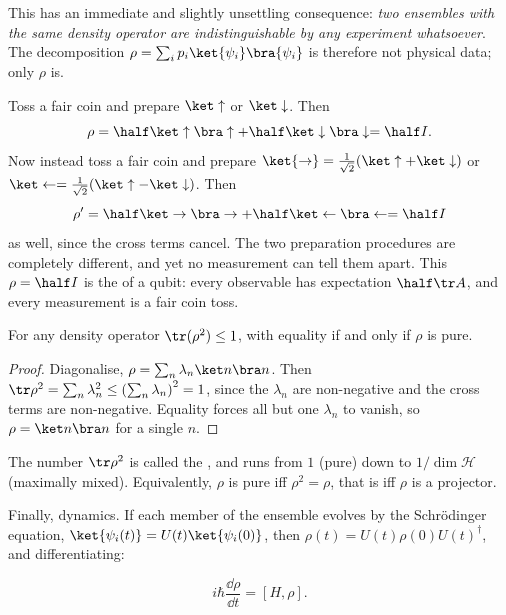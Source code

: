 This has an immediate and slightly unsettling consequence: \emph{two ensembles with the same density operator are indistinguishable by any experiment whatsoever}. The decomposition $\rho = \sum_i p_i\ket{\psi_i}\bra{\psi_i}$ is therefore not physical data; only $\rho$ is.

\begin{example}
    Toss a fair coin and prepare $\ket\uparrow$ or $\ket\downarrow$. Then
    $$
    \rho = \half\ket\uparrow\bra\uparrow + \half\ket\downarrow\bra\downarrow = \half I.
    $$
    Now instead toss a fair coin and prepare $\ket{\rightarrow} = \frac{1}{\sqrt2}(\ket\uparrow+\ket\downarrow)$ or $\ket\leftarrow = \frac{1}{\sqrt2}(\ket\uparrow - \ket\downarrow)$. Then
    $$
    \rho' = \half\ket\rightarrow\bra\rightarrow + \half\ket\leftarrow\bra\leftarrow = \half I
    $$
    as well, since the cross terms cancel. The two preparation procedures are completely different, and yet no measurement can tell them apart. This $\rho = \half I$ is the  of a qubit: every observable has expectation $\half\tr A$, and every measurement is a fair coin toss.
\end{example}

\begin{proposition}[Purity]
    For any density operator $\tr(\rho^2)\leq1$, with equality if and only if $\rho$ is pure.
\end{proposition}
\begin{proof}
    Diagonalise, $\rho = \sum_n\lambda_n\ket n\bra n$. Then $\tr\rho^2 = \sum_n\lambda_n^2 \leq \left(\sum_n\lambda_n\right)^2 = 1$, since the $\lambda_n$ are non-negative and the cross terms are non-negative. Equality forces all but one $\lambda_n$ to vanish, so $\rho = \ket n\bra n$ for a single $n$.
\end{proof}

The number $\tr\rho^2$ is called the , and runs from $1$ (pure) down to $1/\dim\mathcal{H}$ (maximally mixed). Equivalently, $\rho$ is pure iff $\rho^2 = \rho$, that is iff $\rho$ is a projector.

Finally, dynamics. If each member of the ensemble evolves by the Schr\"odinger equation, $\ket{\psi_i(t)} = U(t)\ket{\psi_i(0)}$, then $\rho(t) = U(t)\rho(0)U(t)^\dagger$, and differentiating:

\begin{proposition}
    $$
    i\hbar\frac{\dd \rho}{\dd t} = \left[ H, \rho \right].
    $$
\end{proposition}

